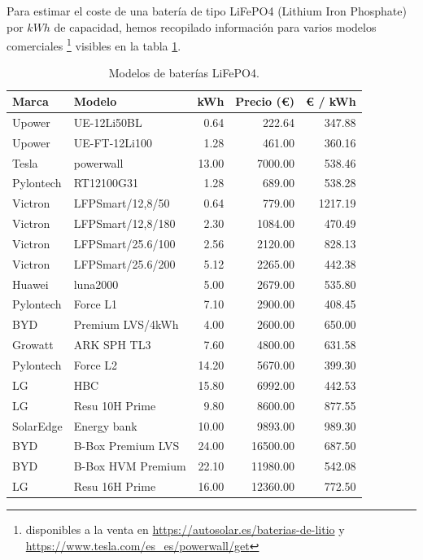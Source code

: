Para estimar el coste de una batería de tipo LiFePO4 (Lithium Iron Phosphate)
por $kWh$ de capacidad, hemos recopilado información para varios modelos
comerciales \footnote{disponibles a la venta en
	\url{https://autosolar.es/baterias-de-litio} y
	\url{https://www.tesla.com/es_es/powerwall/get}} visibles en la tabla
\ref{tab:batteries_data}.

\begin{table}[htbp]
	\centering
	\begin{tabular}{llrrr}
		\toprule
		Marca     & Modelo            & kWh   & Precio (€) & € / kWh \\
		\midrule
		Upower    & UE-12Li50BL       & 0.64  & 222.64     & 347.88  \\
		Upower    & UE-FT-12Li100     & 1.28  & 461.00     & 360.16  \\
		Tesla     & powerwall         & 13.00 & 7000.00    & 538.46  \\
		Pylontech & RT12100G31        & 1.28  & 689.00     & 538.28  \\
		Victron   & LFPSmart/12,8/50  & 0.64  & 779.00     & 1217.19 \\
		Victron   & LFPSmart/12,8/180 & 2.30  & 1084.00    & 470.49  \\
		Victron   & LFPSmart/25.6/100 & 2.56  & 2120.00    & 828.13  \\
		Victron   & LFPSmart/25.6/200 & 5.12  & 2265.00    & 442.38  \\
		Huawei    & luna2000          & 5.00  & 2679.00    & 535.80  \\
		Pylontech & Force L1          & 7.10  & 2900.00    & 408.45  \\
		BYD       & Premium LVS/4kWh  & 4.00  & 2600.00    & 650.00  \\
		Growatt   & ARK SPH TL3       & 7.60  & 4800.00    & 631.58  \\
		Pylontech & Force L2          & 14.20 & 5670.00    & 399.30  \\
		LG        & HBC               & 15.80 & 6992.00    & 442.53  \\
		LG        & Resu 10H Prime    & 9.80  & 8600.00    & 877.55  \\
		SolarEdge & Energy bank       & 10.00 & 9893.00    & 989.30  \\
		BYD       & B-Box Premium LVS & 24.00 & 16500.00   & 687.50  \\
		BYD       & B-Box HVM Premium & 22.10 & 11980.00   & 542.08  \\
		LG        & Resu 16H Prime    & 16.00 & 12360.00   & 772.50  \\
		\bottomrule
	\end{tabular}
	\caption{Modelos de baterías LiFePO4.}
	\label{tab:batteries_data}
\end{table}

